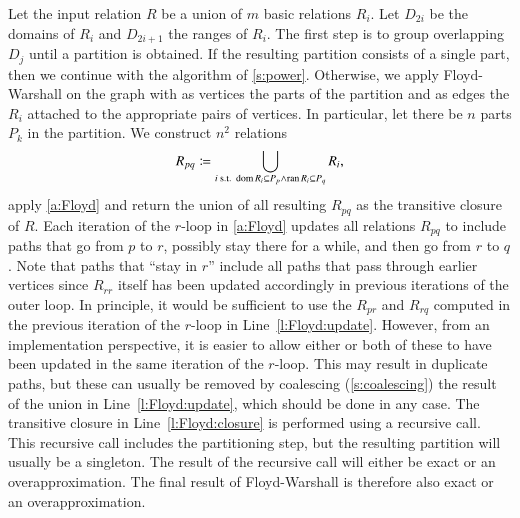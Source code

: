 Let the input relation $R$ be a union of $m$ basic relations $R_i$.
Let $D_{2i}$ be the domains of $R_i$ and $D_{2i+1}$ the ranges of $R_i$.
The first step is to group overlapping $D_j$ until a partition is
obtained.  If the resulting partition consists of a single part,
then we continue with the algorithm of \autoref{s:power}.
Otherwise, we apply Floyd-Warshall on the graph with as vertices
the parts of the partition and as edges the $R_i$ attached to
the appropriate pairs of vertices.
In particular, let there be $n$ parts $P_k$ in the partition.
We construct $n^2$ relations
$$
R_{pq} \coloneqq \bigcup_{i \text{ s.t. } \mathop{\rm dom}\nolimits R_i \subseteq P_p \wedge
				 \mathop{\rm ran}\nolimits R_i \subseteq P_q} R_i
,
$$
apply \autoref{a:Floyd} and return the union of all resulting
$R_{pq}$ as the transitive closure of $R$.
Each iteration of the $r$-loop in \autoref{a:Floyd} updates
all relations $R_{pq}$ to include paths that go from $p$ to $r$,
possibly stay there for a while, and then go from $r$ to $q$.
Note that paths that ``stay in $r$'' include all paths that
pass through earlier vertices since $R_{rr}$ itself has been updated
accordingly in previous iterations of the outer loop.
In principle, it would be sufficient to use the $R_{pr}$
and $R_{rq}$ computed in the previous iteration of the
$r$-loop in Line~\ref{l:Floyd:update}.
However, from an implementation perspective, it is easier
to allow either or both of these to have been updated
in the same iteration of the $r$-loop.
This may result in duplicate paths, but these can usually
be removed by coalescing (\autoref{s:coalescing}) the result of the union
in Line~\ref{l:Floyd:update}, which should be done in any case.
The transitive closure in Line~\ref{l:Floyd:closure}
is performed using a recursive call.  This recursive call
includes the partitioning step, but the resulting partition will
usually be a singleton.
The result of the recursive call will either be exact or an
overapproximation.  The final result of Floyd-Warshall is therefore
also exact or an overapproximation.

